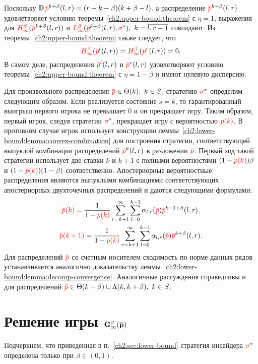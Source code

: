 {Поскольку
$
  \D \pd^{k+\beta}(l, r) = (r-k-\beta)(k+\beta-l),
$
а распределение $\pd^{k+\beta}(l, r)$ удовлетворяет условию теоремы~\ref{ch2:upper-bound:theorem} с $\eta = 1$, выражения для $\H{\infty}(\pd^{k+\beta}(l, r))$ и $\L{\infty}(\pd^{k+\beta}(l, r), \sigmar^*),\ k = \overline{l,r-1}$ совпадают.
Из теоремы~\ref{ch2:upper-bound:theorem} также следует, что
\begin{equation*}
  \H{\infty}(\pd^l(l,r)) = \H{\infty}(\pd^r(l,r)) = 0.
\end{equation*}
В самом деле, распределения $\pd^l(l,r)$ и $\pd^r(l,r)$ удовлетворяют условию теоремы~\ref{ch2:upper-bound:theorem} с $\eta = 1-\beta$ и имеют нулевую дисперсию.

Для произвольного распределения $\pd \in \Theta(k),\ k \in S$, стратегию $\textcolor{red}{\sigma}^*$ определим следующим образом.
Если реализуется состояние $s = k$, то гарантированный выигрыш первого игрока не превышает $0$ и он прекращает игру.
Таким образом, первый игрок, следуя стратегии $\textcolor{red}{\sigma}^*$, прекращает игру с вероятностью $\textcolor{red}{p(k)}$.
В противном случае игрок использует конструкцию леммы~\ref{ch2:lower-bound:lemma:convex-combination} для построения стратегии, соответствующей выпуклой комбинации распределений $\pd^k(l, r)$ в разложении $\pd$.
Первый ход такой стратегии использует две ставки $k$ и $k+1$ с полными вероятностями $(1-\textcolor{red}{p(k)})\beta$ и $(1-\textcolor{red}{p(k)})(1-\beta)$ соответственно.
Апостериорные вероятностные распределения являются выпуклыми комбинациями соответствующих апостериорных двухточечных распределений и даются следующими формулами:
\begin{gather*}
  \pad{k} = \frac{1}{1-\pc{k}} \sum_{r=k+1}^\infty \sum_{l=0}^{k-1} \alpha_{l,r}(\pd) \pd^{k-1+\beta}(l, r), \\
  \pad{k+1} = \frac{1}{1-\pc{k}} \sum_{r=k+1}^\infty \sum_{l=0}^{k-1} \alpha_{l,r}(\pd) \pd^{k+\beta}(l, r).
\end{gather*}
Для распределений $\pd$ со счетным носителем сходимость по норме данных рядов устанавливается аналогично доказательству леммы~\ref{ch2:lower-bound:lemma:decomp-convergence}.
Аналогичные рассуждения справедливы и для распределений $\pd \in \Theta(k+\beta) \cup \Lambda(k, k+\beta),\ k \in S$.

\section{Решение игры $\mathbf{G^\beta_\infty(\p)}$}
\label{ch2:sec:game-solution}

Подчеркнем, что приведенная в п.~\ref{ch2:sec:lower-bound} стратегия инсайдера $\textcolor{red}{\sigma}^*$ определена только при $\beta \in (0, 1)$.

}
